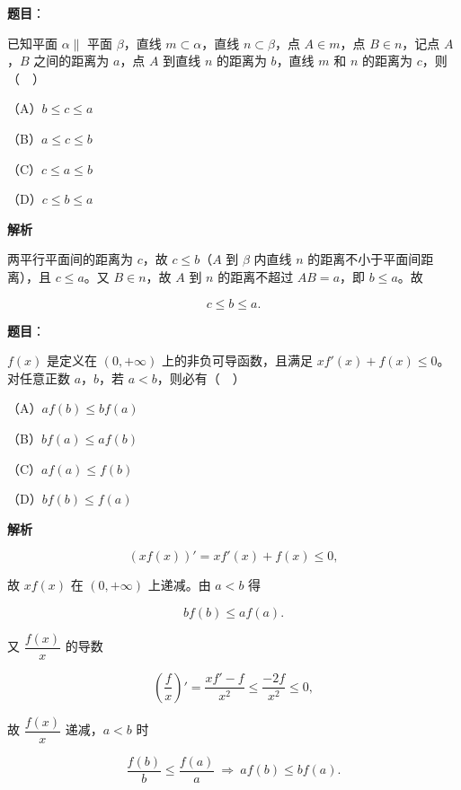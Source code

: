 \begin{answer}

\textbf{题目}：

已知平面 $\alpha\parallel$ 平面 $\beta$，直线 $m\subset\alpha$，直线 $n\subset\beta$，点 $A\in m$，点 $B\in n$，记点 $A$，$B$ 之间的距离为 $a$，点 $A$ 到直线 $n$ 的距离为 $b$，直线 $m$ 和 $n$ 的距离为 $c$，则（　）

（A）$b\leqslant c\leqslant a$

（B）$a\leqslant c\leqslant b$

（C）$c\leqslant a\leqslant b$

（D）$c\leqslant b\leqslant a$

\textbf{解析}

两平行平面间的距离为 $c$，故 $c\leqslant b$（$A$ 到 $\beta$ 内直线 $n$ 的距离不小于平面间距离），且 $c\leqslant a$。又 $B\in n$，故 $A$ 到 $n$ 的距离不超过 $AB=a$，即 $b\leqslant a$。故

\nopagebreak[4]
\[c\leqslant b\leqslant a.\]


\end{answer}
\begin{answer}

\textbf{题目}：

$f(x)$ 是定义在 $(0,+\infty)$ 上的非负可导函数，且满足 $xf'(x)+f(x)\leqslant0$。对任意正数 $a$，$b$，若 $a<b$，则必有（　）

（A）$af(b)\leqslant bf(a)$

（B）$bf(a)\leqslant af(b)$

（C）$af(a)\leqslant f(b)$

（D）$bf(b)\leqslant f(a)$

\textbf{解析}

\nopagebreak[4]
\[(xf(x))'=xf'(x)+f(x)\leqslant0,\]

故 $xf(x)$ 在 $(0,+\infty)$ 上递减。由 $a<b$ 得

\nopagebreak[4]
\[bf(b)\leqslant af(a).\]

又 $\dfrac{f(x)}x$ 的导数

\nopagebreak[4]
\[\left(\frac fx\right)'=\frac{xf'-f}{x^2}\leqslant\frac{-2f}{x^2}\leqslant0,\]

故 $\dfrac{f(x)}x$ 递减，$a<b$ 时

\nopagebreak[4]
\[\frac{f(b)}b\leqslant\frac{f(a)}a\ \Rightarrow\ af(b)\leqslant bf(a).\]


\end{answer}
